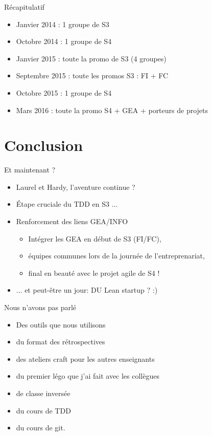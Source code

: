 \documentclass{beamer}
\begin{document}
\begin{frame}{Récapitulatif}
  \begin{itemize}
    \item Janvier 2014 : 1 groupe de S3
    \item Octobre 2014 : 1 groupe de S4
    \item Janvier 2015 : toute la promo de S3 (4 groupes)
    \item Septembre 2015 : toute les promos S3 : FI + FC
    \item Octobre 2015 : 1 groupe de S4
    \item Mars 2016 : toute la promo S4 + GEA + porteurs de projets
  \end{itemize}
\end{frame}

\section{Conclusion}
\begin{frame}{Et maintenant ?}
  \begin{itemize}
    \item Laurel et Hardy, l'aventure continue ?
    \item Étape cruciale du TDD en S3 ...
    \item Renforcement des liens GEA/INFO
      \begin{itemize}
        \item Intégrer les GEA en début de S3 (FI/FC),
        \item équipes communes lors de la journée de l'entreprenariat,
        \item final en beauté avec le projet agile de S4 !
      \end{itemize}
    \item ... et peut-être un jour: DU Lean startup ? :)
  \end{itemize}
\end{frame}

\begin{frame}{Nous n'avons pas parlé}
  \begin{itemize}
    \item Des outils que nous utilisons
    \item du format des rétrospectives
    \item des ateliers craft pour les autres enseignants
    \item du premier légo que j'ai fait avec les collègues
    \item de classe inversée
    \item du cours de TDD
    \item du cours de git.
  \end{itemize}
\end{frame}
\end{document}
